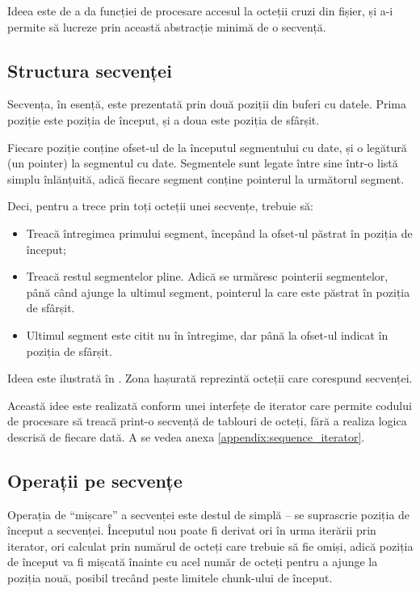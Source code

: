 \documentclass[a4paper,12pt]{report}
\begin{document}
Ideea este de a da funcției de procesare accesul la octeții cruzi din fișier,
și a-i permite să lucreze prin această abstracție minimă de o secvență.

\subsection{Structura secvenței}

Secvența, în esență, este prezentată prin două poziții din buferi cu datele.
Prima poziție este poziția de început, și a doua este poziția de sfârșit.

Fiecare poziție conține ofset-ul de la începutul segmentului cu date,
și o legătură (un pointer) la segmentul cu date.
Segmentele sunt legate între sine într-o listă simplu înlănțuită, adică
fiecare segment conține pointerul la următorul segment.

Deci, pentru a trece prin toți octeții unei secvențe, trebuie să:
\begin{itemize}
    \item
        Treacă întregimea primului segment, începând la ofset-ul păstrat în poziția de început;
    \item
        Treacă restul segmentelor pline.
        Adică se urmăresc pointerii segmentelor, până când ajunge la ultimul segment,
        pointerul la care este păstrat în poziția de sfârșit.
    \item
        Ultimul segment este citit nu în întregime, dar până la ofset-ul
        indicat în poziția de sfârșit.
\end{itemize}

Ideea este ilustrată în .
Zona hașurată reprezintă octeții care corespund secvenței.


Această idee este realizată conform unei interfețe de iterator care permite codului de procesare
să treacă print-o secvență de tablouri de octeți, fără a realiza logica descrisă de fiecare dată.
A se vedea anexa \ref{appendix:sequence_iterator}.

\subsection{Operații pe secvențe}

Operația de ``mișcare'' a secvenței este destul de simplă -- se suprascrie poziția de început a secvenței.
Începutul nou poate fi derivat ori în urma iterării prin iterator,
ori calculat prin numărul de octeți care trebuie să fie omiși,
adică poziția de început va fi mișcată înainte cu acel număr de octeți
pentru a ajunge la poziția nouă, posibil trecând peste limitele chunk-ului de început.
\end{document}
